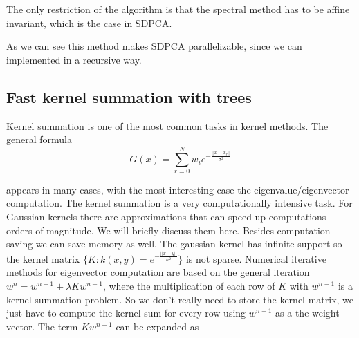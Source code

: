 \documentclass[12pt,letterpaper,doublespaced,ETD,dvips,proposal]{gtthesis}
\begin{document}
\begin{Body}

\vspace{1cm}

The only restriction of the algorithm is that the spectral method
has to be affine invariant, which is the case in SDPCA.

As we can see this method makes SDPCA parallelizable, since we can
implemented in a recursive way.


\subsection{Fast kernel summation with trees} Kernel summation is
one of the most common tasks in kernel methods. The general formula
\begin{equation}
\label{kernel_sum}
  G(x)=\sum_{r=0}^{N} w_i e^{-\frac{||x-x_r||}{\sigma^2}}
\end{equation}

appears in many cases, with the most interesting case the
eigenvalue/eigenvector computation. The kernel summation is a very
computationally intensive task. For Gaussian kernels there are
approximations that can speed up computations orders of magnitude.
We will briefly discuss them here. Besides computation saving we can
save memory as well. The gaussian kernel has infinite support so the
kernel matrix $\{K : k(x,y)=e^{-\frac{||x-y||}{\sigma^2}} \}$ is not
sparse. Numerical iterative methods for eigenvector computation are
based on the general iteration $w^n=w^{n-1}+\lambda Kw^{n-1}$, where
the multiplication of each row of $K$ with $w^{n-1}$ is a kernel
summation problem. So we don't really need to store the kernel
matrix, we just have to compute the kernel sum for every row using
$w^{n-1}$ as a the weight vector. The term $Kw^{n-1}$ can be
expanded as


\end{Body}
\end{document}
